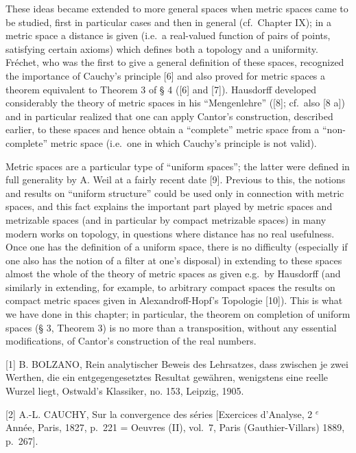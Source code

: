 These ideas became extended to more general spaces when metric spaces came to be studied, first in particular cases and then in general (cf.~Chapter IX); in a metric space a distance is given (i.e.~a real-valued function of pairs of points, satisfying certain axioms) which defines both a topology and a uniformity. Fréchet, who was the first to give a general definition of these spaces, recognized the importance of Cauchy's principle {[}6{]} and also proved for metric spaces a theorem equivalent to Theorem 3 of § 4 ({[}6{]} and {[}7{]}). Hausdorff developed considerably the theory of metric spaces in his ``Mengenlehre'' ({[}8{]}; cf.~also {[}8 a{]}) and in particular realized that one can apply Cantor's construction, described earlier, to these spaces and hence obtain a ``complete'' metric space from a ``non-complete'' metric space (i.e.~one in which Cauchy's principle is not valid).

Metric spaces are a particular type of ``uniform spaces''; the latter were defined in full generality by A. Weil at a fairly recent date {[}9{]}. Previous to this, the notions and results on ``uniform structure'' could be used only in connection with metric spaces, and this fact explains the important part played by metric spaces and metrizable spaces (and in particular by compact metrizable spaces) in many modern works on topology, in questions where distance has no real usefulness. Once one has the definition of a uniform space, there is no difficulty (especially if one also has the notion of a filter at one's disposal) in extending to these spaces almost the whole of the theory of metric spaces as given e.g.~by Hausdorff (and similarly in extending, for example, to arbitrary compact spaces the results on compact metric spaces given in Alexandroff-Hopf's Topologie {[}10{]}). This is what we have done in this chapter; in particular, the theorem on completion of uniform spaces (§ 3, Theorem 3) is no more than a transposition, without any essential modifications, of Cantor's construction of the real numbers.


{[}1{]} B. BOLZANO, Rein analytischer Beweis des Lehrsatzes, dass zwischen je zwei Werthen, die ein entgegengesetztes Resultat gewähren, wenigstens eine reelle Wurzel liegt, Ostwald's Klassiker, no. 153, Leipzig, 1905.

{[}2{]} A.-L. CAUCHY, Sur la convergence des séries {[}Exercices d'Analyse, 2 \(^{e}\) Année, Paris, 1827, p.~221 = Oeuvres (II), vol.~7, Paris (Gauthier-Villars) 1889, p.~267{]}.

